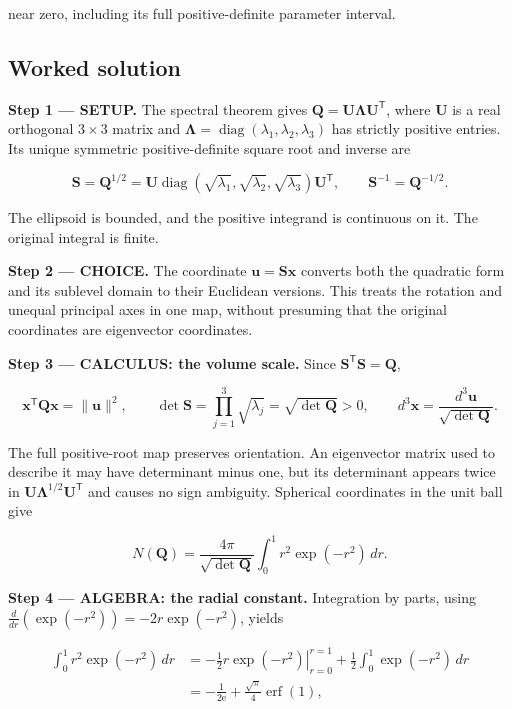 \documentclass[11pt,oneside,openany]{book}
\begin{document}
near zero, including its full positive-definite parameter interval.
\subsection*{Worked solution}

\textbf{Step 1 --- SETUP.} The spectral theorem gives \(\mathbf Q=\mathbf U\boldsymbol\Lambda\mathbf U^{\mathsf T}\), where \(\mathbf U\) is a real orthogonal \(3\times3\) matrix and \(\boldsymbol\Lambda=\operatorname{diag}(\lambda_1,\lambda_2,\lambda_3)\) has strictly positive entries. Its unique symmetric positive-definite square root and inverse are

\[
\mathbf S=\mathbf Q^{1/2}
=\mathbf U\operatorname{diag}(\sqrt{\lambda_1},\sqrt{\lambda_2},\sqrt{\lambda_3})\mathbf U^{\mathsf T},
\qquad \mathbf S^{-1}=\mathbf Q^{-1/2}.
\]

The ellipsoid is bounded, and the positive integrand is continuous on it. The original integral is finite.

\begin{ChoiceStep}
\textbf{Step 2 --- CHOICE.} The coordinate \(\mathbf u=\mathbf S\mathbf x\) converts both the quadratic form and its sublevel domain to their Euclidean versions. This treats the rotation and unequal principal axes in one map, without presuming that the original coordinates are eigenvector coordinates.

\end{ChoiceStep}
\textbf{Step 3 --- CALCULUS: the volume scale.} Since \(\mathbf S^{\mathsf T}\mathbf S=\mathbf Q\),

\[
\mathbf x^{\mathsf T}\mathbf Q\mathbf x=\|\mathbf u\|^2,
\qquad
\det\mathbf S=\prod_{j=1}^3\sqrt{\lambda_j}=\sqrt{\det\mathbf Q}>0,
\qquad
d^3\mathbf x=\frac{d^3\mathbf u}{\sqrt{\det\mathbf Q}}.
\]

The full positive-root map preserves orientation. An eigenvector matrix used to describe it may have determinant minus one, but its determinant appears twice in \(\mathbf U\boldsymbol\Lambda^{1/2}\mathbf U^{\mathsf T}\) and causes no sign ambiguity. Spherical coordinates in the unit ball give

\[
N(\mathbf Q)=\frac{4\pi}{\sqrt{\det\mathbf Q}}\int_0^1r^2\exp(-r^2)\,dr.
\]

\begingroup\color{AlgebraBlue}
\textbf{Step 4 --- ALGEBRA: the radial constant.} Integration by parts, using \(\frac{d}{dr}(\exp(-r^2))=-2r\exp(-r^2)\), yields

\[
\begin{aligned}
\int_0^1r^2\exp(-r^2)\,dr
&=-\frac12\left.r\exp(-r^2)\right|_{r=0}^{r=1}
+\frac12\int_0^1\exp(-r^2)\,dr\\
&=-\frac{1}{2\mathrm e}+\frac{\sqrt\pi}{4}\operatorname{erf}(1),
\end{aligned}
\]
\end{document}
